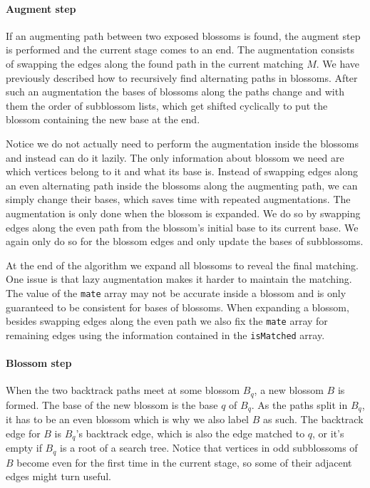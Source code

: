 \paragraph*{Augment step}

If an augmenting path between two exposed blossoms is found, the augment step is performed and the current stage comes to an end. The augmentation consists of swapping the edges along the found path in the current matching $M$. We have previously described how to recursively find alternating paths in blossoms. After such an augmentation the bases of blossoms along the paths change and with them the order of subblossom lists, which get shifted cyclically to put the blossom containing the new base at the end. 

Notice we do not actually need to perform the augmentation inside the blossoms and instead can do it lazily. The only information about blossom we need are which vertices belong to it and what its base is. Instead of swapping edges along an even alternating path inside the blossoms along the augmenting path, we can simply change their bases, which saves time with repeated augmentations. The augmentation is only done when the blossom is expanded. We do so by swapping edges along the even path from the blossom's initial base to its current base. We again only do so for the blossom edges and only update the bases of subblossoms. 

At the end of the algorithm we expand all blossoms to reveal the final matching. One issue is that lazy augmentation makes it harder to maintain the matching. The value of the \texttt{mate} array may not be accurate inside a blossom and is only guaranteed to be consistent for bases of blossoms.  When expanding a blossom, besides swapping edges along the even path we also fix the \texttt{mate} array for remaining edges using the information contained in the \texttt{isMatched} array.

\paragraph*{Blossom step}

When the two backtrack paths meet at some blossom $B_q$, a new blossom $B$ is formed. The base of the new blossom is the base $q$ of $B_q$. As the paths split in $B_q$, it has to be an even blossom which is why we also label $B$ as such. The backtrack edge for $B$ is $B_q$'s backtrack edge, which is also the edge matched to $q$, or it's empty if $B_q$ is a root of a search tree. Notice that vertices in odd subblossoms of $B$ become even for the first time in the current stage, so some of their adjacent edges might turn useful.

